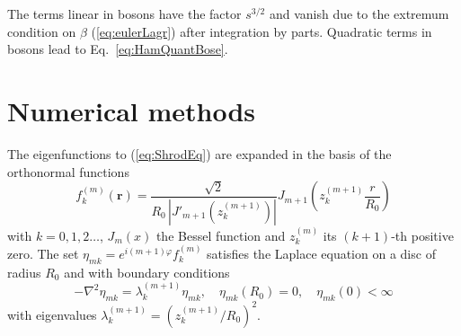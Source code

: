 \documentclass[aps,prb,twocolumn,superscriptaddress,nobalancelastpage]{revtex4-1}
\begin{document}
The terms linear in bosons have the factor $s^{3/2}$ and vanish due to the extremum condition on $\beta$ (\ref{eq:eulerLagr}) after integration by parts. Quadratic terms in bosons lead to Eq.\ \eqref{eq:HamQuantBose}. 


\section{\label{app:num} Numerical methods}

The eigenfunctions to (\ref{eq:ShrodEq}) are expanded in the basis of the orthonormal functions 
\begin{equation}
f_{k}^{(m)}\left( \mathbf{r} \right) = 
\frac{\sqrt 2 }{R_0 \, | J'_{m+1}( z_k^{(m+1)}  ) |}J_{m+1}\left( z_k^{(m+1)}\frac{r}{R_0} \right)
\label{eq:basisMain}
\end{equation}
with $k=0,1,2\ldots$,  $J_m(x)$ the Bessel function and $z_k^{(m)}$ its $(k+1)$-th positive zero. The set $\eta_{mk} = e^{i(m+1)\varphi } f_{k}^{(m)}$ satisfies the Laplace equation on a disc of radius $R_0$ and with boundary conditions 
\[ 
 - \nabla^{2} \eta_{mk} = \lambda _k^{(m + 1)} \eta_{mk}, 
 \quad \eta_{mk} (R_0) = 0, \quad \eta_{mk} (0) < \infty
\]
with eigenvalues $\lambda _k^{(m + 1)} = (  {z_k^{(m+1)}}/ {R_0} )^{2}$.

%
\end{document}
